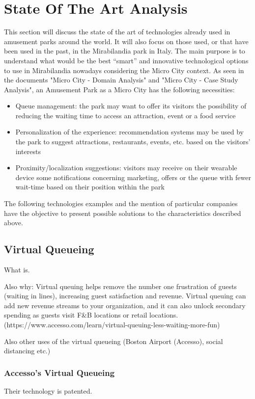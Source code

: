 \section{State Of The Art Analysis}\label{sec:state-of-the-art-analysis}
This section will discuss the state of the art of technologies already used in amusement parks around the world.
It will also focus on those used, or that have been used in the past, in the Mirabilandia park in Italy.
The main purpose is to understand what would be the best ``smart'' and innovative technological options to use in Mirabilandia nowadays considering the Micro City context.
As seen in the documents "Micro City - Domain Analysis" and "Micro City - Case Study Analysis", an Amusement Park as a Micro City has the following necessities:
\begin{itemize}
    \item Queue management: the park may want to offer its visitors the possibility of reducing the waiting time to access an attraction, event or a food service
    \item Personalization of the experience: recommendation systems may be used by the park to suggest attractions, restaurants, events, etc. based on the visitors' interests
    \item Proximity/localization suggestions: visitors may receive on their wearable device some notifications concerning marketing, offers or the queue with fewer wait-time based on their position within the park
\end{itemize}

The following technologies examples and the mention of particular companies have the objective to present possible solutions to the characteristics described above.

\subsection{Virtual Queueing}\label{subsec:virtual-queueing}
What is.

Also why: Virtual queuing helps remove the number one frustration of guests (waiting in lines), increasing guest
satisfaction and revenue.
Virtual queuing can add new revenue streams to your organization, and it can also unlock
secondary spending as guests visit F\&B locations or retail locations.
(https://www.accesso.com/learn/virtual-queuing-less-waiting-more-fun)

Also other uses of the virtual queueing (Boston Airport (Accesso), social distancing etc.)
\subsubsection{Accesso's Virtual Queueing}
Their technology is patented.

